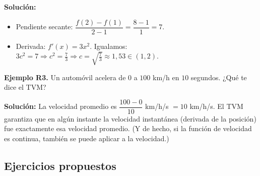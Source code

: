 \documentclass[12pt, a4paper]{article}
\begin{document}
\begin{cuadrosolucion}
  \textbf{Solución:}
  \begin{itemize}
    \item Pendiente secante: $\dfrac{f(2) - f(1)}{2 - 1} = \dfrac{8 - 1}{1} = 7$.
    \item Derivada: $f'(x) = 3x^2$. Igualamos: $3c^2 = 7 \Rightarrow c^2 = \frac{7}{3} \Rightarrow c = \sqrt{\frac{7}{3}} \approx 1{,}53 \in (1, 2)$.
  \end{itemize}
\end{cuadrosolucion}

\textbf{Ejemplo R3.} Un automóvil acelera de $0$ a $100$ km/h en $10$ segundos. ¿Qué te dice el TVM?

\begin{cuadrosolucion}
  \textbf{Solución:} La velocidad promedio es $\dfrac{100 - 0}{10}$ km/h/s $= 10$ km/h/s. El TVM garantiza que en algún instante la velocidad instantánea (derivada de la posición) fue exactamente esa velocidad promedio. (Y de hecho, si la función de velocidad es continua, también se puede aplicar a la velocidad.)
\end{cuadrosolucion}

\newpage

\subsection{Ejercicios propuestos}
\end{document}

